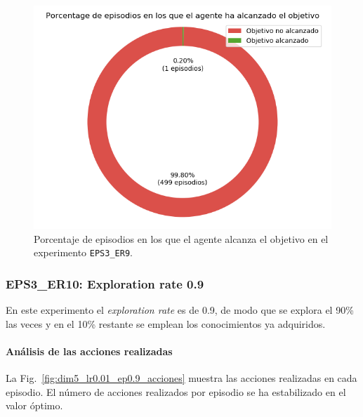 \begin{figure}
    \centering
    \includegraphics[scale=0.4]{cap5_experimentacion/images/dim5_lr0.01_ep0.8_porcentajeResuelto.png}
    \caption{Porcentaje de episodios en los que el agente alcanza el objetivo en el experimento \texttt{EPS3\_ER9}.}
    \label{fig:dim5_lr0.01_ep0.8_porcentajeResuelto}
\end{figure}

\subsubsection{EPS3\_ER10: Exploration rate 0.9}

En este experimento el \textit{exploration rate} es de 0.9, de modo que se explora el 90\% las veces y en el 10\% restante se emplean los conocimientos ya adquiridos.

\paragraph{Análisis de las acciones realizadas}

La Fig.~\ref{fig:dim5_lr0.01_ep0.9_acciones} muestra las acciones realizadas en cada episodio. El número de acciones realizados por episodio se ha estabilizado en el valor óptimo. \\

